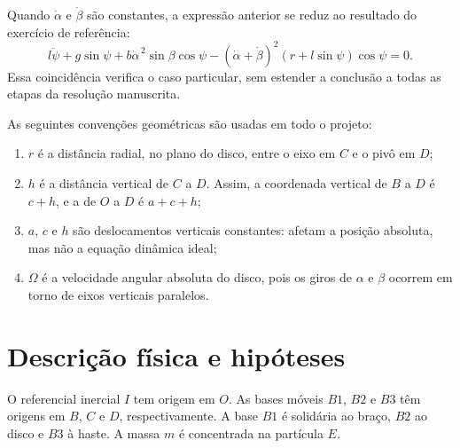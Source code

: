 \documentclass[11pt,a4paper]{article}
\begin{document}
Quando $\dot\alpha$ e $\dot\beta$ são constantes, a expressão anterior se reduz
ao resultado do exercício de referência:
\begin{equation}
 l\ddot\psi+g\sin\psi
 +b\dot\alpha^{\,2}\sin\beta\cos\psi
 -(\dot\alpha+\dot\beta)^2\left(r+l\sin\psi\right)\cos\psi=0.
\label{eq:eom-constant-rate}
\end{equation}
Essa coincidência verifica o caso particular, sem estender a conclusão a todas
as etapas da resolução manuscrita.

As seguintes convenções geométricas são usadas em todo o projeto:
\begin{enumerate}
  \item $r$ é a distância radial, no plano do disco, entre o eixo em $C$ e o
  pivô em $D$;
  \item $h$ é a distância vertical de $C$ a $D$. Assim, a coordenada vertical
  de $B$ a $D$ é $c+h$, e a de $O$ a $D$ é $a+c+h$;
  \item $a$, $c$ e $h$ são deslocamentos verticais constantes: afetam a posição
  absoluta, mas não a equação dinâmica ideal;
  \item $\Omega$ é a velocidade angular absoluta do disco, pois os giros de
  $\alpha$ e $\beta$ ocorrem em torno de eixos verticais paralelos.
\end{enumerate}
\section{Descrição física e hipóteses}

O referencial inercial $I$ tem origem em $O$. As bases móveis $B1$, $B2$ e $B3$
têm origens em $B$, $C$ e $D$, respectivamente. A base $B1$ é solidária ao
braço, $B2$ ao disco e $B3$ à haste. A massa $m$ é concentrada na partícula $E$.
\end{document}
